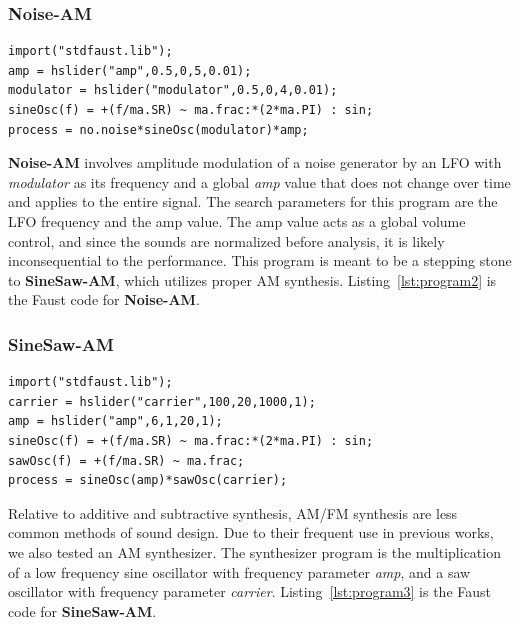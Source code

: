 \documentclass[lettersize,journal]{IEEEtran}
\newcommand{\AmpMod}{\textbf{Noise-AM}}
\newcommand{\FMMod}{\textbf{SineSaw-AM}}
\begin{document}
\subsubsection{\AmpMod}
\label{sec:program2}
\begin{lstlisting}[caption={\AmpMod}, label={lst:program2},language=Faust,float,floatplacement=TBH,xleftmargin=1em,xrightmargin=0.5em,firstnumber=0]
import("stdfaust.lib");
amp = hslider("amp",0.5,0,5,0.01);
modulator = hslider("modulator",0.5,0,4,0.01);
sineOsc(f) = +(f/ma.SR) ~ ma.frac:*(2*ma.PI) : sin;
process = no.noise*sineOsc(modulator)*amp;
\end{lstlisting}

\AmpMod{} involves amplitude modulation of a noise generator by an LFO with \textit{modulator} as its frequency and a global \textit{amp} value that does not change over time and applies to the entire signal. The search parameters for this program are the LFO frequency and the amp value. The amp value acts as a global volume control, and since the sounds are normalized before analysis, it is likely inconsequential to the performance. This program is meant to be a stepping stone to \FMMod, which utilizes proper AM synthesis. Listing~\ref{lst:program2} is the Faust code for \AmpMod. 

\subsubsection{\FMMod}

\label{sec:program3}
\begin{lstlisting}[caption={\FMMod}, label={lst:program3},language=Faust,float,floatplacement=TBH,xleftmargin=1em,xrightmargin=0.5em,firstnumber=0]
import("stdfaust.lib");
carrier = hslider("carrier",100,20,1000,1);
amp = hslider("amp",6,1,20,1);
sineOsc(f) = +(f/ma.SR) ~ ma.frac:*(2*ma.PI) : sin;
sawOsc(f) = +(f/ma.SR) ~ ma.frac;
process = sineOsc(amp)*sawOsc(carrier);
\end{lstlisting}
Relative to additive and subtractive synthesis, AM/FM synthesis are less common methods of sound design. Due to their frequent use in previous works, we also tested an AM synthesizer. The synthesizer program is the multiplication of a low frequency sine oscillator with frequency parameter \textit{amp}, and a saw oscillator with frequency parameter \textit{carrier}. Listing~\ref{lst:program3} is the Faust code for \FMMod. 
\end{document}
